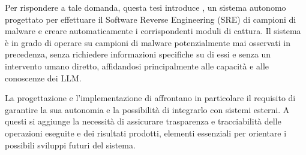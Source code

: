 

Per rispondere a tale domanda, questa tesi introduce \system{}, un sistema autonomo progettato per effettuare il Software Reverse Engineering (SRE) di campioni di malware e creare automaticamente i corrispondenti moduli di cattura. Il sistema è in grado di operare su campioni di malware potenzialmente mai osservati in precedenza, senza richiedere informazioni specifiche su di essi e senza un intervento umano diretto, affidandosi principalmente alle capacità e alle conoscenze dei LLM.




La progettazione e l'implementazione di \system{} affrontano in particolare il requisito di garantire la sua autonomia e la possibilità di integrarlo con sistemi esterni. A questi si aggiunge la necessità di assicurare trasparenza e tracciabilità delle operazioni eseguite e dei risultati prodotti, elementi essenziali per orientare i possibili sviluppi futuri del sistema.


